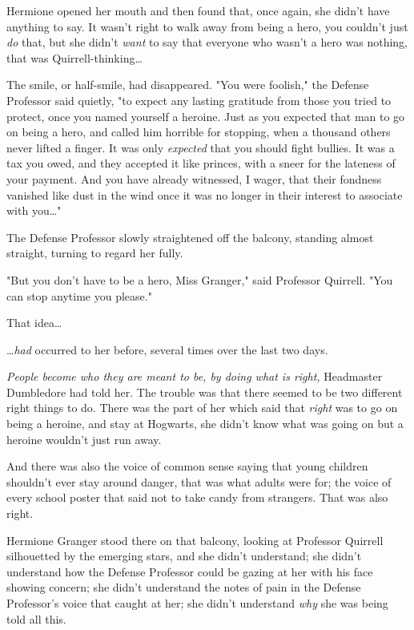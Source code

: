 Hermione opened her mouth and then found that, once again, she didn't have
anything to say. It wasn't right to walk away from being a hero, you couldn't
just \emph{do} that, but she didn't \emph{want} to say that everyone who wasn't
a hero was nothing, that was Quirrell-thinking{\ldots}

The smile, or half-smile, had disappeared. "You were foolish," the Defense
Professor said quietly, "to expect any lasting gratitude from those you tried
to protect, once you named yourself a heroine. Just as you expected that man to
go on being a hero, and called him horrible for stopping, when a thousand
others never lifted a finger. It was only \emph{expected} that you should fight
bullies. It was a tax you owed, and they accepted it like princes, with a sneer
for the lateness of your payment. And you have already witnessed, I wager, that
their fondness vanished like dust in the wind once it was no longer in their
interest to associate with you{\ldots}"

The Defense Professor slowly straightened off the balcony, standing almost
straight, turning to regard her fully.

"But you don't have to be a hero, Miss Granger," said Professor Quirrell. "You
can stop anytime you please."

That idea{\ldots}

{\ldots}\emph{had} occurred to her before, several times over the last two days.

\emph{People become who they are meant to be, by doing what is right,}
Headmaster Dumbledore had told her. The trouble was that there seemed to be two
different right things to do. There was the part of her which said that
\emph{right} was to go on being a heroine, and stay at Hogwarts, she didn't
know what was going on but a heroine wouldn't just run away.

And there was also the voice of common sense saying that young children
shouldn't ever stay around danger, that was what adults were for; the voice of
every school poster that said not to take candy from strangers. That was also
right.

Hermione Granger stood there on that balcony, looking at Professor Quirrell
silhouetted by the emerging stars, and she didn't understand; she didn't
understand how the Defense Professor could be gazing at her with his face
showing concern; she didn't understand the notes of pain in the Defense
Professor's voice that caught at her; she didn't understand \emph{why} she was
being told all this.

